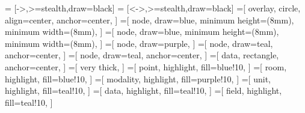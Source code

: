 \newcommand{\nodetext}[1]{\scalebox{0.7}{#1}}
\newcommand{\hlnodetext}[1]{\nodetext{\textbf{#1}}}
\newcommand{\modalitytext}[1]{\scalebox{0.65}{#1}}
\newcommand{\hlmodalitytext}[1]{\modalitytext{\textbf{#1}}}
\newcommand{\fieldtext}[1]{\scalebox{0.7}{#1}}
\newcommand{\hlfieldtext}[1]{\fieldtext{\textbf{#1}}}
\newcommand{\edgetext}[1]{\scalebox{0.7}{\textit{#1}}}
\newcommand{\hledgetext}[1]{\edgetext{\textbf{#1}}}
\newcommand{\centerspacing}[0]{2.0}
\newcommand{\pointsize}[0]{(8mm)}
\newcommand{\datadist}[0]{(11mm)}
\newcommand{\pointdist}[0]{(\pointsize/2+9mm)}
\newcommand{\roomdist}[0]{(49mm)}
\newcommand{\sqrttwo}[0]{(1.41421356237)}
\newcommand{\diagside}[0]{(0.70710678119)}

 = [->,>=stealth,draw=black]
 = [<->,>=stealth,draw=black]
=[
  overlay,
  circle,
  align=center,
  anchor=center,
]
=[
  node,
  draw=blue,
  minimum height=\pointsize,
  minimum width=\pointsize,
]
=[
  node,
  draw=blue,
  minimum height=\pointsize,
  minimum width=\pointsize,
]
=[
  node,
  draw=purple,
]
=[
  node,
  draw=teal,
  anchor=center,
]
=[
  node,
  draw=teal,
  anchor=center,
]
=[
  data,
  rectangle,
  anchor=center,
]
=[
  very thick,
]
=[
  point,
  highlight,
  fill=blue!10,
]
=[
  room,
  highlight,
  fill=blue!10,
]
=[
  modality,
  highlight,
  fill=purple!10,
]
=[
  unit,
  highlight,
  fill=teal!10,
]
=[
  data,
  highlight,
  fill=teal!10,
]
=[
  field,
  highlight,
  fill=teal!10,
]

